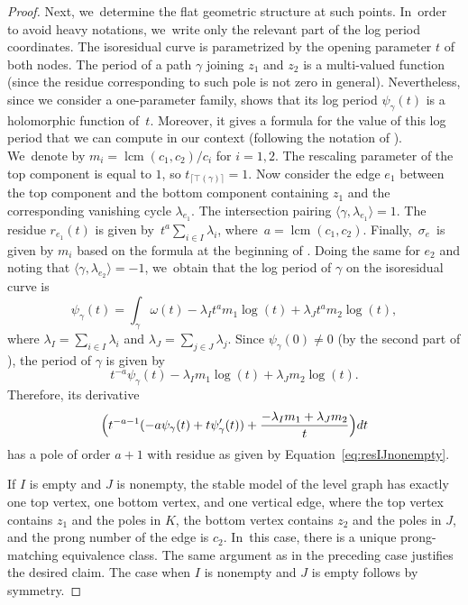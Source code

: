 \documentclass[JEP,XML,SOM,Unicode,NoFloatCountersInSection,published]{cedram}
\DeclareMathOperator{\lcm}{lcm}
\theoremstyle{definition}
\begin{document}
\begin{proof}
Next, we~determine the flat geometric structure at such points. In~order to avoid heavy notations, we~write only the relevant part of the log period coordinates. The isoresidual curve is parametrized by the opening parameter $t$ of both nodes. The period of a path $\gamma$ joining $z_{1}$ and $z_{2}$ is a multi-valued function (since the residue corresponding to such pole is not zero in general). Nevertheless, since we consider a one-parameter family, \cite[Cor.\,6.3]{BenBound} shows that its log period $\psi_{\gamma}(t)$ is a holomorphic function of~$t$. Moreover, it gives a formula for the value of this log period that we can compute in our context (following the notation of \cite[Def.\,5.1]{BenBound}). We~denote by $m_{i}=\lcm (c_1, c_2)/c_{i}$ for $i=1,2$. The rescaling parameter of the top component is equal to $1$, so $t_{\lceil\top(\gamma)\rceil}=1$. Now consider the edge $e_{1}$ between the top component and the bottom component containing $z_{1}$ and the corresponding vanishing cycle $\lambda_{e_{1}}$. The intersection pairing $\langle\gamma,\lambda_{e_{1}}\rangle = 1$. The residue $r_{e_{1}}(t)$ is given by~$t^{a}\sum_{i\in I}\lambda_{i}$, where~$a = \lcm (c_1, c_2)$. Finally,~$\sigma_{e}$~is given by $m_{i}$ based on the formula at the beginning of \cite[\S 7.4]{BenBound}. Doing the same for $e_{2}$ and noting that $\langle\gamma,\lambda_{e_{2}}\rangle = -1$, we~obtain that the log period of $\gamma$ on the isoresidual curve is
\begin{equation*}
\psi_{\gamma}(t) = \int_{\gamma}\omega(t) - \lambda_{I}t^{a}m_{1}\log(t)+\lambda_{J}t^{a}m_{2}\log(t),
\end{equation*}
where $\lambda_I = \sum_{i\in I}\lambda_{i}$ and $\lambda_J = \sum_{j\in J}\lambda_{j}$.
Since $\psi_{\gamma}(0)\neq0$ (by the second part of \cite[Cor.\,6.3]{BenBound}), the period of $\gamma$ is given by
\[
t^{-a}\psi_{\gamma}(t) - \lambda_{I}m_{1}\log(t)+\lambda_{J}m_{2}\log(t).
\]
Therefore, its derivative
\[
\Bigl(t^{-a-1}(-a\psi_{\gamma}(t)+t\psi_{\gamma}'(t)) + \frac{-\lambda_{I}m_{1} + \lambda_{J}m_{2}}{t}\Bigr)dt
\]
has a pole of order $a+1$ with residue as given by Equation~\eqref{eq:resIJnonempty}.

If $I$ is empty and $J$ is nonempty, the stable model of the level graph has exactly one top vertex, one bottom vertex, and one vertical edge, where the top vertex contains $z_1$ and the poles in $K$, the bottom vertex contains $z_2$ and the poles in $J$, and the prong number of the edge is $c_2$. In~this case, there is a unique prong-matching equivalence class. The same argument as in the preceding case justifies the desired claim. The case when $I$ is nonempty and $J$ is empty follows by symmetry.


\end{proof}
\end{document}
